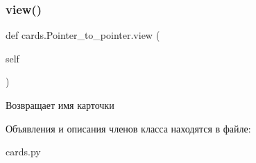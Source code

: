 \subsubsection{\texorpdfstring{view()}{view()}}
{\footnotesize\ttfamily def cards.\+Pointer\+\_\+to\+\_\+pointer.\+view (\begin{DoxyParamCaption}\item[{}]{self }\end{DoxyParamCaption})}



Возвращает имя карточки 



Объявления и описания членов класса находятся в файле\+:\begin{DoxyCompactItemize}
\item 
cards.\+py\end{DoxyCompactItemize}
